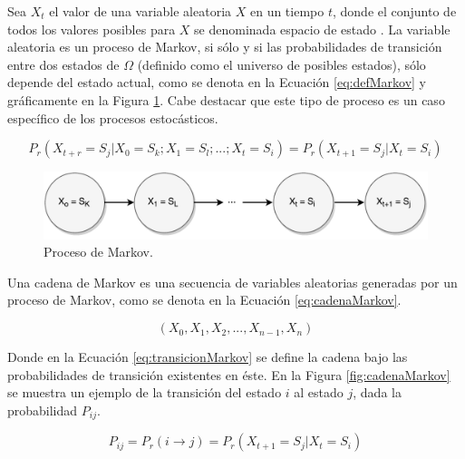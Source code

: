 Sea $X_t$ el valor de una variable aleatoria $X$ en un tiempo $t$, donde el conjunto de todos los valores posibles para $X$ se denominada espacio de estado \citep{ching2006markov}. La variable aleatoria es un proceso de Markov, si sólo y si las probabilidades de transición entre dos estados de $\Omega$ (definido como el universo de posibles estados), sólo depende del estado actual, como se denota en la Ecuación \ref{eq:defMarkov} y gráficamente en la Figura \ref{fig:procesoMarkov}. Cabe destacar que este tipo de proceso es un caso específico de los procesos estocásticos.

\begin{equation} \label{eq:defMarkov} 
	P_r(X_{t+r} = S_j | X_0 = S_k ; X_1 = S_l ; ... ; X_t = S_i) = P_r(X_{t+1} = S_j | X_t = S_i)
\end{equation}

\begin{figure}[ht!]
  \centering
    \includegraphics[scale=0.6]{images/ProcesoMarkov.pdf}
  \caption{Proceso de Markov.}
  \label{fig:procesoMarkov}
\end{figure}

Una cadena de Markov es una secuencia de variables aleatorias generadas por un proceso de Markov, como se denota en la Ecuación \ref{eq:cadenaMarkov}.

\begin{equation} \label{eq:cadenaMarkov}
	(X_0, X_1, X_2, ..., X_{n-1}, X_{n})
\end{equation}

\normalsize{Donde en la Ecuación} \ref{eq:transicionMarkov} \normalsize{se define la cadena bajo las probabilidades de transición existentes en éste.} En la Figura \ref{fig:cadenaMarkov} se muestra un ejemplo de la transición del estado $i$ al estado $j$, dada la probabilidad $P_{ij}$.

\begin{equation} \label{eq:transicionMarkov}
	P_{ij} = P_r(i \rightarrow j) = P_r(X_{t+1} = S_j | X_t = S_i)
\end{equation}

